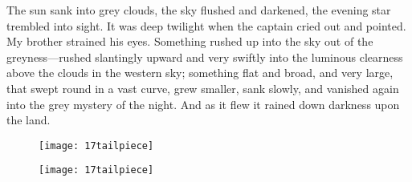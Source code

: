 The sun sank into grey clouds, the sky flushed and darkened, the evening star trembled into sight. It was deep twilight when the captain cried out and pointed. My brother strained his eyes. Something rushed up into the sky out of the greyness—rushed slantingly upward and very swiftly into the luminous clearness above the clouds in the western sky; something flat and broad, and very large, that swept round in a vast curve, grew smaller, sank slowly, and vanished again into the grey mystery of the night. And as it flew it rained down darkness upon the land.


\makeatletter
{}
{%
	\begin{figure}[b!]
	\centering
	\texttt{[image: 17tailpiece]}
	\end{figure}
}{%
	\begin{figure}[b!]
	\centering
	\texttt{[image: 17tailpiece]}
	\end{figure}
	\enlargethispage{2\baselineskip}
}
\makeatother





